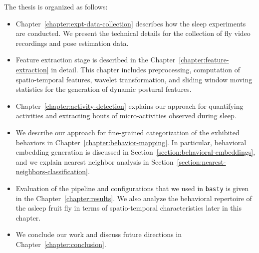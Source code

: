 The thesis is organized as follows:
\begin{itemize}
	\item Chapter~\ref{chapter:expt-data-collection} describes how the sleep experiments are conducted. We present the technical details for the collection of fly video recordings and pose estimation data.
	\item Feature extraction stage is described in the Chapter~\ref{chapter:feature-extraction} in detail. This chapter includes preprocessing, computation of spatio-temporal features, wavelet transformation, and sliding window moving statistics for the generation of dynamic postural features.
	\item Chapter~\ref{chapter:activity-detection} explains our approach for quantifying activities and extracting bouts of micro-activities observed during sleep.
	\item We describe our approach for fine-grained categorization of the exhibited behaviors in Chapter~\ref{chapter:behavior-mapping}. In particular, behavioral embedding generation is discussed in Section~\ref{section:behavioral-embeddings}, and we explain nearest neighbor analysis in Section~\ref{section:nearest-neighbors-classification}.
	\item Evaluation of the pipeline and configurations that we used in \texttt{basty} is given in the Chapter~\ref{chapter:results}.  We also analyze the behavioral repertoire of the asleep fruit fly in terms of spatio-temporal characteristics later in this chapter.
	\item We conclude our work and discuss future directions in Chapter~\ref{chapter:conclusion}.
\end{itemize}
